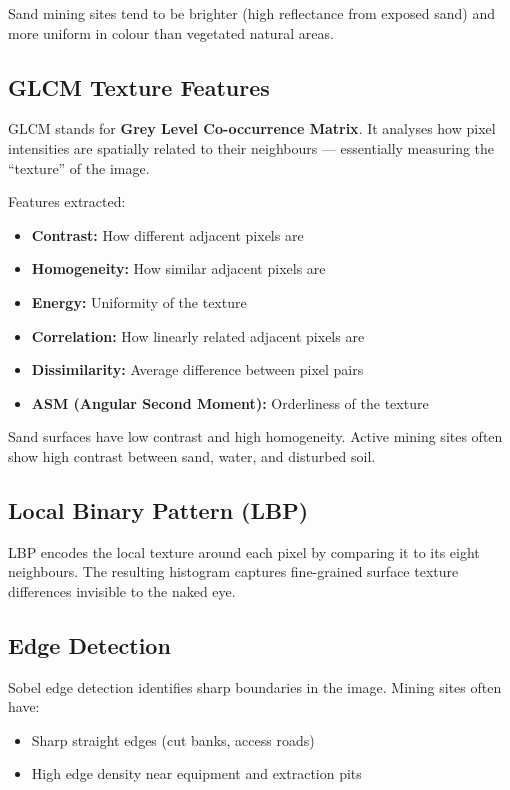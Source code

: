 \documentclass[12pt, a4paper]{article}
\begin{document}
Sand mining sites tend to be brighter (high reflectance from exposed
sand) and more uniform in colour than vegetated natural areas.

\subsection{GLCM Texture Features}

GLCM stands for \textbf{Grey Level Co-occurrence Matrix}. It analyses
how pixel intensities are spatially related to their neighbours ---
essentially measuring the ``texture'' of the image.

Features extracted:
\begin{itemize}[noitemsep]
  \item \textbf{Contrast:} How different adjacent pixels are
  \item \textbf{Homogeneity:} How similar adjacent pixels are
  \item \textbf{Energy:} Uniformity of the texture
  \item \textbf{Correlation:} How linearly related adjacent pixels are
  \item \textbf{Dissimilarity:} Average difference between pixel pairs
  \item \textbf{ASM (Angular Second Moment):} Orderliness of the texture
\end{itemize}

Sand surfaces have low contrast and high homogeneity. Active mining
sites often show high contrast between sand, water, and disturbed soil.

\subsection{Local Binary Pattern (LBP)}

LBP encodes the local texture around each pixel by comparing it to
its eight neighbours. The resulting histogram captures fine-grained
surface texture differences invisible to the naked eye.

\subsection{Edge Detection}

Sobel edge detection identifies sharp boundaries in the image. Mining
sites often have:
\begin{itemize}[noitemsep]
  \item Sharp straight edges (cut banks, access roads)
  \item High edge density near equipment and extraction pits
\end{itemize}
\end{document}
